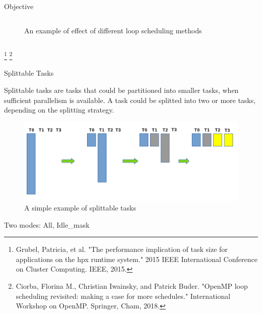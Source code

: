 \documentclass[10pt]{beamer}
\begin{document}
\begin{frame}{Objective}
\begin{outline}
\begin{columns}
\begin{figure}
			\caption{An example of effect of different loop scheduling methods}		
			\label{figloop}		
		\end{figure}
	\end{columns}
\footnote{Grubel, Patricia, et al. "The performance implication of task size for applications on the hpx runtime system." 2015 IEEE International Conference on Cluster Computing. IEEE, 2015.}
\footnote{Ciorba, Florina M., Christian Iwainsky, and Patrick Buder. "OpenMP loop scheduling revisited: making a case for more schedules." International Workshop on OpenMP. Springer, Cham, 2018.}
	\end{outline}		
\end{frame}



\begin{frame}{Splittable Tasks}
	\begin{outline}
		
		\1Splittable tasks are tasks that could be partitioned into smaller tasks, when sufficient parallelism is available.
		\2 A task could be splitted into two or more tasks, depending on the splitting strategy.
		
		\vspace{\baselineskip}
		\begin{figure}
			\centering
			\includegraphics[width=0.72\linewidth]{images/spt_simple.png}
				\caption{A simple example of splittable tasks}
			
		\end{figure}
	\2Two modes: All, Idle\_mask
	\end{outline}
\end{frame}
\end{document}
